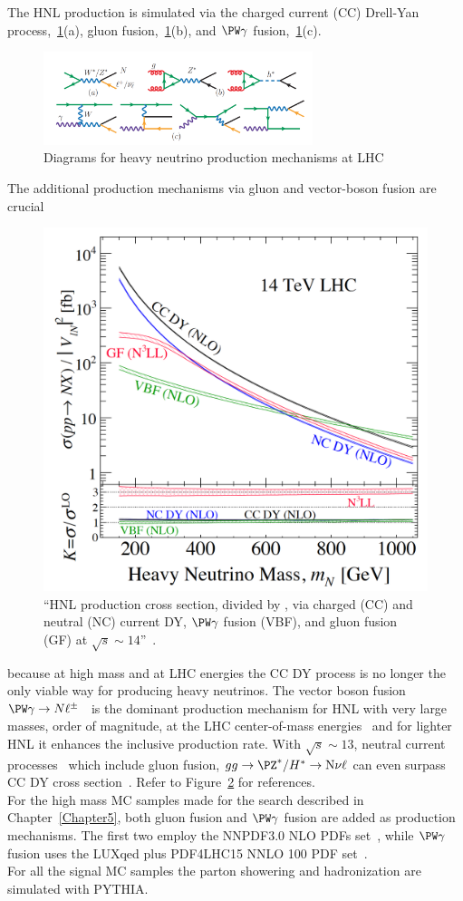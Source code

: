 The HNL production is simulated via the charged current (CC) Drell-Yan
process,~\ref{fid:hnl_production}(a), gluon
fusion,~\ref{fid:hnl_production}(b), and $\PW \gamma$
fusion,~\ref{fid:hnl_production}(c). 
\begin{figure}[h!]
\centering
 \includegraphics[clip,trim=0cm 0cm 0cm 1cm, width=0.70\textwidth]{Figures/c4/hnl_production}
  \caption{Diagrams for heavy neutrino production mechanisms at LHC~\cite{Pascoli_2019}}
  \label{fid:hnl_production}
\end{figure}

The additional production mechanisms via gluon and vector-boson fusion are
crucial
\begin{figure}
  \includegraphics[clip,trim=0cm 0cm 0.5cm 0.5cm, width=.39\textwidth]{Figures/c4/hnl_lhc_production}
  \caption{``HNL production cross section, divided by \mixpar, via
charged (CC) and neutral (NC) current DY, $\PW \gamma$ fusion (VBF),
and gluon fusion (GF) at $\sqrt{s}
\sim 14$\TeV ''~\cite{Pascoli_2019}.}
  \label{fig:hnl_lhc_graph}
\end{figure} 
 because at high mass and at LHC energies the CC DY process
is no longer the only viable way for producing heavy neutrinos. The
vector boson fusion $\PW \gamma \rightarrow N
\ell^{\pm}$~\cite{PhysRevLett.112.081801, Alva:2014gxa,Degrande_2016}
is the dominant production mechanism for HNL with very large masses,
\TeV order of magnitude, at the LHC center-of-mass
energies~\cite{Alva:2014gxa,Degrande_2016, Pascoli_2019} and for
lighter HNL it enhances the inclusive production rate. With $\sqrt{s}
\sim 13$\TeV, neutral current
processes~\cite{PhysRevD.44.1593,WILLENBROCK1985429} which include
gluon fusion, $gg \rightarrow \PZ^{*}/H^{*} \rightarrow \hnl \nu \ell$
can even surpass CC DY cross section~\cite{PhysRevD.96.055042,
  Pascoli_2019}. Refer to Figure~\ref{fig:hnl_lhc_graph} for
references.\\
For the high mass MC samples made for the search described in
Chapter~\ref{Chapter5}, both gluon
fusion and $\PW \gamma$
fusion are added as production mechanisms. 
The first two employ
the NNPDF3.0 NLO PDFs set~\cite{Ball_2015}, while $\PW \gamma$
fusion uses the LUXqed plus PDF4LHC15 NNLO 100
PDF set~\cite{PhysRevLett.117.242002}.\\
For all the signal MC samples the parton showering and hadronization are simulated with PYTHIA. \\


